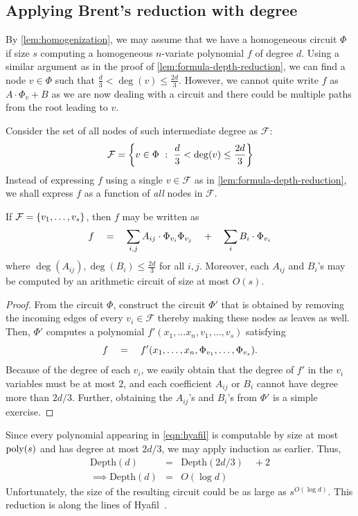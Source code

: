 \subsection{Applying Brent's reduction with degree}

By \autoref{lem:homogenization}, we may assume that we have a homogeneous circuit $\Phi$ if size $s$ computing a homogeneous $n$-variate polynomial $f$ of degree $d$. 
Using a similar argument as in the proof of \autoref{lem:formula-depth-reduction}, we can find a node $v \in \Phi$ such that $\frac{d}{3} < \deg(v) \leq \frac{2d}{3}$. 
However, we cannot quite write $f$ as $A \cdot \Phi_v + B$ as we are now dealing with a circuit and there could be multiple paths from the root leading to $v$.

Consider the set of all nodes of such intermediate degree as $\mathcal{F}$:
\[
\mathcal{F} = \left\{{v\in \Phi}\ : \ {\frac{d}{3} < \deg(v)\leq \frac{2d}{3}}\right\}
\]
Instead of expressing $f$ using a single $v\in \mathcal{F}$ as in \autoref{lem:formula-depth-reduction}, we shall express $f$ as a function of \emph{all} nodes in $\mathcal{F}$. 

\begin{claim}
If $\mathcal{F} = \left\{v_1,\dots, v_s\right\}$, then $f$ may be written as
\begin{equation}\label{eqn:hyafil}
f \quad = \quad \sum_{i,j} A_{ij} \cdot \Phi_{v_i} \Phi_{v_j} \quad + \quad \sum_i B_i \cdot \Phi_{v_i}
\end{equation}
where $\deg(A_{ij}), \deg(B_i) \leq \frac{2d}{3}$ for all $i,j$. 
Moreover, each $A_{ij}$ and $B_i$'s may be computed by an arithmetic circuit of size at most $O(s)$. 
\end{claim}
\begin{proof}
From the circuit $\Phi$, construct the circuit $\Phi'$ that is obtained by removing the incoming edges of every $v_i \in \mathcal{F}$ thereby making these nodes as leaves as well. 
Then, $\Phi'$ computes a polynomial $f'(x_1,\dots x_n, v_1,\dots, v_s)$ satisfying 
\[
f \quad = \quad f'(x_1,\dots, x_n, \Phi_{v_1},\dots, \Phi_{v_s}).
\]
Because of the degree of each $v_i$, we easily obtain that the degree of $f'$ in the $v_i$ variables must be at most $2$, and each coefficient $A_{ij}$ or $B_i$ cannot have degree more than $2d/3$. 
Further, obtaining the $A_{ij}$'s and $B_i$'s from $\Phi'$ is a simple exercise. 
\end{proof}

Since every polynomial appearing in \eqref{eqn:hyafil} is computable by size at most $\operatorname{poly}(s)$ and has degree at most $2d/3$, we may apply induction as earlier. 
Thus,
\begin{eqnarray*}
\mathrm{Depth}(d) & = & \mathrm{Depth}(2d/3) \quad + 2\\
\implies \mathrm{Depth}(d) & = & O(\log d)
\end{eqnarray*}
Unfortunately, the size of the resulting circuit could be as large as $s^{O(\log d)}$. 
This reduction is along the lines of Hyafil~\cite{Hyafil1978}. 

